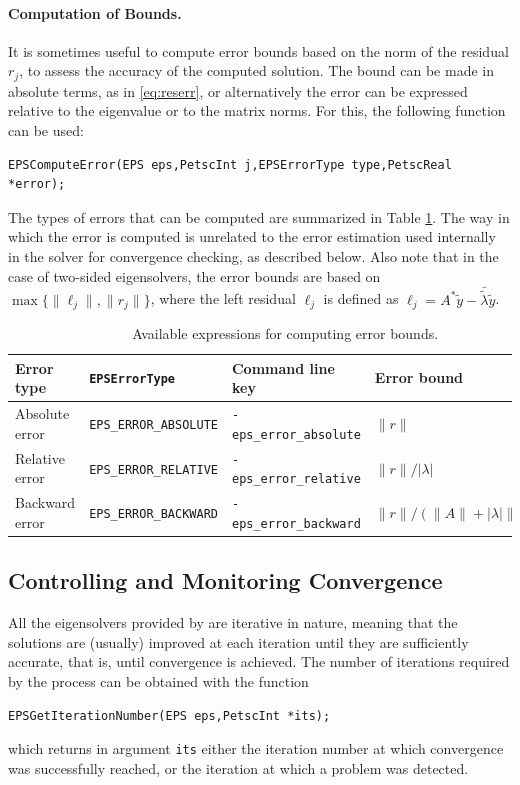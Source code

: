 \paragraph{Computation of Bounds.}
It is sometimes useful to compute error bounds based on the norm of the residual $r_j$, to assess the accuracy of the computed solution. The bound can be made in absolute terms, as in \eqref{eq:reserr}, or alternatively the error can be expressed relative to the eigenvalue or to the matrix norms. For this, the following function can be used:
	\begin{Verbatim}[fontsize=\small]
	EPSComputeError(EPS eps,PetscInt j,EPSErrorType type,PetscReal *error);
	\end{Verbatim}
The types of errors that can be computed are summarized in Table \ref{tab:errors}.
The way in which the error is computed is unrelated to the error estimation used internally in the solver for convergence checking, as described below. Also note that in the case of two-sided eigensolvers, the error bounds are based on $\max\{\|\ell_j\|,\|r_j\|\}$, where the left residual $\ell_j$ is defined as $\ell_j=A^*\tilde{y}-\bar{\tilde\lambda}\tilde{y}$.

\begin{table}
\centering
{\small \begin{tabular}{llll}
Error type     & \texttt{EPSErrorType}         & Command line key               & Error bound \\\hline
Absolute error & \texttt{EPS\_ERROR\_ABSOLUTE} & \texttt{-eps\_error\_absolute} & $\|r\|$ \\
Relative error & \texttt{EPS\_ERROR\_RELATIVE} & \texttt{-eps\_error\_relative} & $\|r\|/|\lambda|$ \\
Backward error & \texttt{EPS\_ERROR\_BACKWARD} & \texttt{-eps\_error\_backward} & $\|r\|/(\|A\|+|\lambda|\|B\|)$ \\
\hline
\end{tabular} }
\caption{\label{tab:errors}Available expressions for computing error bounds.}
\end{table}

\subsection{Controlling and Monitoring Convergence}
\label{sec:monitor}

	All the eigensolvers provided by \slepc are iterative in nature, meaning that the solutions are (usually) improved at each iteration until they are sufficiently accurate, that is, until convergence is achieved. The number of iterations required by the process can be obtained with the function%
	\begin{Verbatim}[fontsize=\small]
        EPSGetIterationNumber(EPS eps,PetscInt *its);
	\end{Verbatim}
which returns in argument \texttt{its} either the iteration number at which convergence was successfully reached, or the iteration at which a problem was detected.

